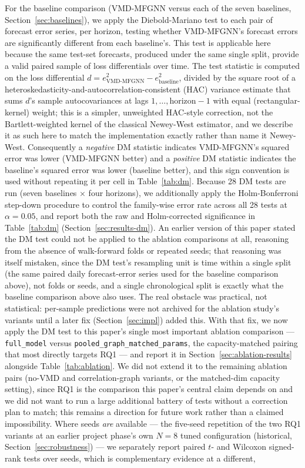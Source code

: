 \documentclass[journal]{IEEEtran}
\begin{document}
For the baseline comparison (VMD-MFGNN versus each of the seven baselines, Section~\ref{sec:baselines}), we apply the Diebold-Mariano test \citep{DieboldMariano1995} to each pair of forecast error series, per horizon, testing whether VMD-MFGNN's forecast errors are significantly different from each baseline's. This test is applicable here because the same test-set forecasts, produced under the same single split, provide a valid paired sample of loss differentials over time. The test statistic is computed on the loss differential $d = e_{\text{VMD-MFGNN}}^2 - e_{\text{baseline}}^2$, divided by the square root of a heteroskedasticity-and-autocorrelation-consistent (HAC) variance estimate that sums $d$'s sample autocovariances at lags $1,\ldots,\text{horizon}-1$ with equal (rectangular-kernel) weight; this is a simpler, unweighted HAC-style correction, not the Bartlett-weighted kernel of the classical Newey-West estimator, and we describe it as such here to match the implementation exactly rather than name it Newey-West. Consequently a \emph{negative} DM statistic indicates VMD-MFGNN's squared error was lower (VMD-MFGNN better) and a \emph{positive} DM statistic indicates the baseline's squared error was lower (baseline better), and this sign convention is used without repeating it per cell in Table~\ref{tab:dm}. Because 28 DM tests are run (seven baselines $\times$ four horizons), we additionally apply the Holm-Bonferroni step-down procedure \citep{Holm1979} to control the family-wise error rate across all 28 tests at $\alpha=0.05$, and report both the raw and Holm-corrected significance in Table~\ref{tab:dm} (Section~\ref{sec:results-dm}). An earlier version of this paper stated the DM test could not be applied to the ablation comparisons at all, reasoning from the absence of walk-forward folds or repeated seeds; that reasoning was itself mistaken, since the DM test's resampling unit is time within a single split (the same paired daily forecast-error series used for the baseline comparison above), not folds or seeds, and a single chronological split is exactly what the baseline comparison above also uses. The real obstacle was practical, not statistical: per-sample predictions were not archived for the ablation study's variants until a later fix (Section~\ref{sec:impl}) added this. With that fix, we now apply the DM test to this paper's single most important ablation comparison --- \texttt{full\_model} versus \texttt{pooled\_graph\_matched\_params}, the capacity-matched pairing that most directly targets RQ1 --- and report it in Section~\ref{sec:ablation-results} alongside Table~\ref{tab:ablation}. We did not extend it to the remaining ablation pairs (no-VMD and correlation-graph variants, or the matched-dim capacity setting), since RQ1 is the comparison this paper's central claim depends on and we did not want to run a large additional battery of tests without a correction plan to match; this remains a direction for future work rather than a claimed impossibility. Where seeds \emph{are} available --- the five-seed repetition of the two RQ1 variants at an earlier project phase's own $N=8$ tuned configuration (historical, Section~\ref{sec:robustness}) --- we separately report paired $t$- and Wilcoxon signed-rank tests over seeds, which is complementary evidence at a different, 
\end{document}
